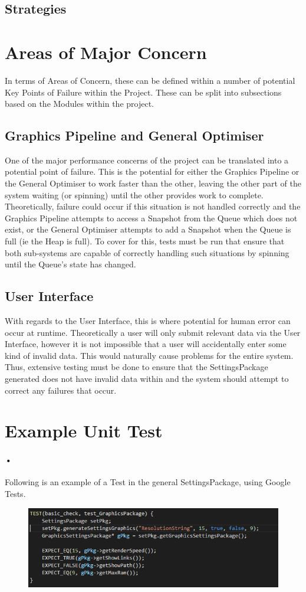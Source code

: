 \documentclass[11pt]{article}
\begin{document}
\subsection{Strategies}

\section{Areas of Major Concern}
In terms of Areas of Concern, these can be defined within a number of potential Key Points of Failure within the Project. These can be split into subsections based on the Modules within the project.
\subsection{Graphics Pipeline and General Optimiser}
One of the major performance concerns of the project can be translated into a potential point of failure. This is the potential for either the Graphics Pipeline or the General Optimiser to work faster than the other, leaving the other part of the system waiting (or spinning) until the other provides work to complete. Theoretically, failure could occur if this situation is not handled correctly and the Graphics Pipeline attempts to access a Snapshot from the Queue which does not exist, or the General Optimiser attempts to add a Snapshot when the Queue is full (ie the Heap is full). 
\newline To cover for this, tests must be run that ensure that both sub-systems are capable of correctly handling such situations by spinning until the Queue's state has changed.
\subsection{User Interface}
With regards to the User Interface, this is where potential for human error can occur at runtime. Theoretically a user will only submit relevant data via the User Interface, however it is not impossible that a user will accidentally enter some kind of invalid data. This would naturally cause problems for the entire system.
\newline Thus, extensive testing must be done to ensure that the SettingsPackage generated does not have invalid data within and the system should attempt to correct any failures that occur.


\section{Example Unit Test}
\paragraph{•}
Following is an example of a Test in the general SettingsPackage, using Google Tests.
\begin{figure}[h]
\includegraphics[scale=0.7]{GTest.png}
\end{figure}
\end{document}
